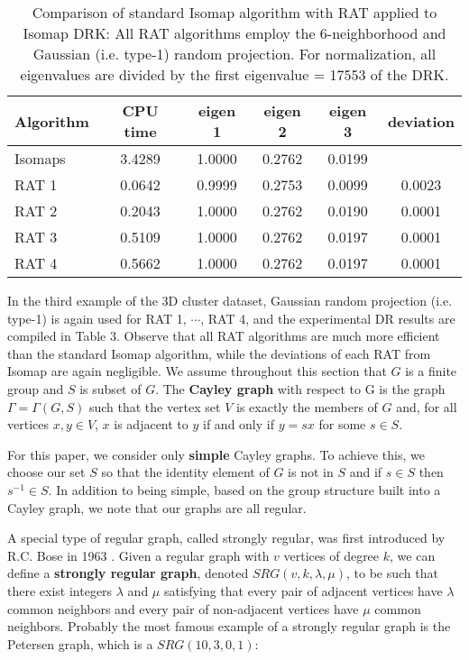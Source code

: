 \begin{table}[htb]
\begin{center}
\begin{tabular}
[c]{|l|c|c|c|c|c|}\hline
Algorithm & CPU time & eigen 1 & eigen 2 & eigen 3 &  deviation    \\ \hline
Isomaps &  3.4289  & 1.0000  & 0.2762  & 0.0199  &    \\ \hline
RAT          1 &  0.0642  & 0.9999  & 0.2753  & 0.0099  & 0.0023    \\ \hline
RAT          2 &  0.2043  & 1.0000  & 0.2762  & 0.0190  & 0.0001    \\ \hline
RAT          3 &  0.5109  & 1.0000  & 0.2762  & 0.0197  & 0.0001    \\ \hline
RAT          4 &  0.5662  & 1.0000  & 0.2762  & 0.0197  & 0.0001    \\ \hline
\end{tabular}
\caption{\small{Comparison of standard Isomap algorithm with RAT applied to Isomap DRK: All RAT algorithms employ the $6$-neighborhood and Gaussian (i.e. type-1) random projection. For normalization, all eigenvalues are divided by the first eigenvalue = 17553 of the DRK.}}
\end{center}
\label{Tbl2}
\end{table}

In the third example of the 3D cluster dataset, Gaussian random projection (i.e. type-1) is again used for RAT 1, $\cdots$, RAT 4,  and the experimental DR results are compiled in Table 3.  Observe that all RAT algorithms are much more efficient than the standard Isomap algorithm, while the deviations of each  RAT from Isomap are again negligible.
We assume throughout this section that $G$ is a finite group and $S$ is subset of $G$. The \textbf{Cayley graph} with respect to G is the graph $\Gamma = \Gamma (G,S)$ such that the vertex set $V$ is exactly the members of $G$ and, for all vertices $x,y\in V$,  $x$ is adjacent to $y$ if and only if $y = sx$ for some $s\in S$.

For this paper, we consider only \textbf{simple} Cayley graphs. To achieve this, we choose our set $S$ so that the identity element of $G$ is not in $S$ and if $s\in S$ then $s^{-1}\in S$. In addition to being simple, based on the group structure built into a Cayley graph, we note that our graphs are all regular.

A special type of regular graph, called strongly regular, was first introduced by  R.C. Bose in 1963 \cite{BCN}. Given a regular graph with $v$ vertices of degree $k$, we can define a \textbf{strongly regular graph}, denoted $SRG(v,k,\lambda, \mu)$, to be such that there exist integers $\lambda$ and $\mu$ satisfying that every pair of adjacent vertices have $\lambda$ common neighbors and every pair of non-adjacent vertices have $\mu$ common neighbors. Probably the most famous example of a strongly regular graph is the Petersen graph, which is a $SRG(10,3,0,1)$:

